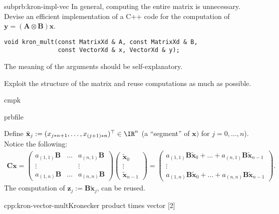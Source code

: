 \begin{samproblem}
\begin{subproblem}{subprb:kron-impl-vec}
  In general, computing the entire matrix is unnecessary.
  Devise an efficient implementation of a C++ code for the computation of
  $\mathbf{y} = (\mathbf{A} \otimes \mathbf{B}) \mathbf{x}$.
  \begin{lstlisting}[style=cppsimple]
void kron_mult(const MatrixXd & A, const MatrixXd & B,
               const VectorXd & x, VectorXd & y);
  \end{lstlisting}
  The meaning of the arguments should be self-explanatory.

  Exploit the structure of the matrix and reuse computations as much as possible.

\begin{samwriteprbpart}{cmpk}
  \begin{writeverbatim}{prbfile}
    \begin{samsolution}
      Define $\tilde{\mathbf{x}}_{j} := (x_{j*n + 1}, \dots, x_{(j+1)*n})^\top \in \IR^{n}$
      (a ``segment'' of $\mathbf{x})$ for $j = 0, \dots, n$). Notice the following:
      \begin{align*}
        \mathbf{C} \mathbf{x} = \begin{pmatrix}
          a_{(1,1)} \mathbf{B} & \dots & a_{(n,1)} \mathbf{B} \\
          \vdots              &       & \vdots               \\
          a_{(1,n)} \mathbf{B} & \dots & a_{(n,n)} \mathbf{B}
        \end{pmatrix} \begin{pmatrix}
          \tilde{\mathbf{x}}_{0} \\
          \vdots \\
          \tilde{\mathbf{x}}_{n-1}
        \end{pmatrix} = \begin{pmatrix}
          a_{(1,1)} \mathbf{B} \tilde{\mathbf{x}}_{0} + \dots + a_{(n,1)} \mathbf{B} \tilde{\mathbf{x}}_{n-1} \\
          \vdots              \\
          a_{(1,n)} \mathbf{B} \tilde{\mathbf{x}}_{0} + \dots + a_{(n,n)} \mathbf{B} \tilde{\mathbf{x}}_{n-1}
        \end{pmatrix}.
      \end{align*}
      The computation of $\mathbf{z}_j := \mathbf{B} \tilde{\mathbf{x}}_{j}$, can be reused.
      \begin{samcode}[C++11-code]{cpp:kron-vector-mult}{Kronecker product times vector}
        [2]
      \end{samcode}
    \end{samsolution}
  \end{writeverbatim}
\end{samwriteprbpart}
\end{subproblem}


\end{samproblem}
